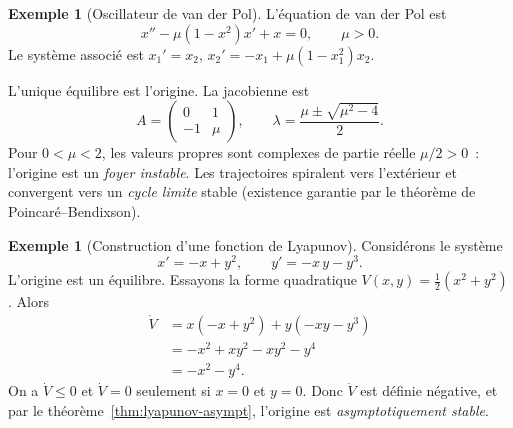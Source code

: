 \documentclass[12pt,a4paper,openany]{book}
\theoremstyle{definition}
\newtheorem{exemple}[definition]{Exemple}
\theoremstyle{plain}
\theoremstyle{remark}
\begin{document}
\begin{exemple}[Oscillateur de van der Pol]\label{ex:van-der-pol}
  L'équation de van der Pol est
  \[
    x''-\mu(1-x^2)x'+x=0, \qquad \mu>0.
  \]
  Le système associé est
  $x_1'=x_2$,
  $x_2'=-x_1+\mu(1-x_1^2)x_2$.

  L'unique équilibre est l'origine. La jacobienne est
  \[
    A=\begin{pmatrix}0&1\\-1&\mu\end{pmatrix},
    \qquad \lambda=\frac{\mu\pm\sqrt{\mu^2-4}}{2}.
  \]
  Pour $0<\mu<2$, les valeurs propres sont complexes de partie réelle
  $\mu/2>0$~: l'origine est un \emph{foyer instable}. Les trajectoires
  spiralent vers l'extérieur et convergent vers un \emph{cycle
  limite} stable (existence garantie par le
  théorème de Poincaré--Bendixson).

  \begin{center}
  \end{center}
\end{exemple}

\begin{exemple}[Construction d'une fonction de Lyapunov]\label{ex:construction-lyapunov}
  Considérons le système
  \[
    x'=-x+y^2, \qquad y'=-x\,y-y^3.
  \]
  L'origine est un équilibre. Essayons la forme quadratique
  $V(x,y)=\frac{1}{2}(x^2+y^2)$. Alors
  \begin{align*}
    \dot{V} &= x(-x+y^2)+y(-xy-y^3) \\
            &= -x^2+xy^2-xy^2-y^4 \\
            &= -x^2-y^4.
  \end{align*}
  On a $\dot{V}\leq 0$ et $\dot{V}=0$ seulement si $x=0$ et $y=0$.
  Donc $\dot{V}$ est définie négative, et par le
  théorème~\ref{thm:lyapunov-asympt}, l'origine est
  \emph{asymptotiquement stable}.
\end{exemple}
\end{document}
